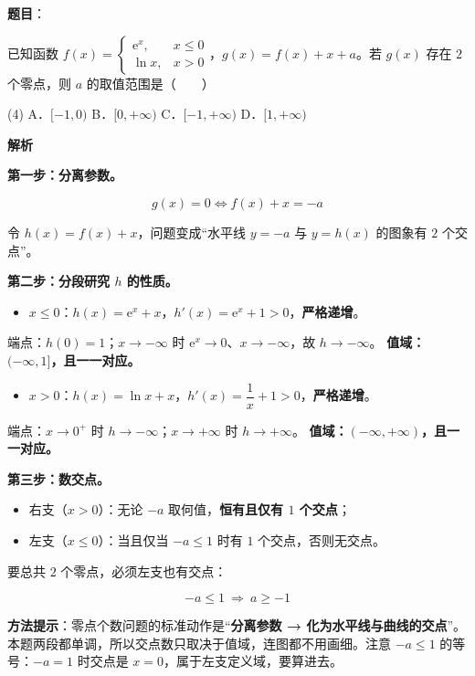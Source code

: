 \begin{answer}

\textbf{题目}：

已知函数 $f(x)=\begin{cases}\mathrm e^{x},&x\le0\\ \ln x,&x>0\end{cases}$，$g(x)=f(x)+x+a$。若 $g(x)$ 存在 $2$ 个零点，则 $a$ 的取值范围是\mbox{（　　）}

\begin{gkopts}(4)
\task A．$[-1,0)$
\task B．$[0,+\infty)$
\task C．$[-1,+\infty)$
\task D．$[1,+\infty)$
\end{gkopts}

\textbf{解析}

\textbf{第一步：分离参数。}

\nopagebreak[4]
\[g(x)=0\iff f(x)+x=-a\]

令 $h(x)=f(x)+x$，问题变成“水平线 $y=-a$ 与 $y=h(x)$ 的图象有 $2$ 个交点”。

\textbf{第二步：分段研究 $h$ 的性质。}

\begin{itemize}
\item $x\le0$：$h(x)=\mathrm e^{x}+x$，$h'(x)=\mathrm e^{x}+1>0$，\textbf{严格递增}。
\end{itemize}
  端点：$h(0)=1$；$x\to-\infty$ 时 $\mathrm e^{x}\to0$、$x\to-\infty$，故 $h\to-\infty$。
  \textbf{值域：$(-\infty,1]$，且一一对应。}

\begin{itemize}
\item $x>0$：$h(x)=\ln x+x$，$h'(x)=\dfrac1x+1>0$，\textbf{严格递增}。
\end{itemize}
  端点：$x\to0^{+}$ 时 $h\to-\infty$；$x\to+\infty$ 时 $h\to+\infty$。
  \textbf{值域：$(-\infty,+\infty)$，且一一对应。}

\textbf{第三步：数交点。}

\begin{itemize}
\item 右支（$x>0$）：无论 $-a$ 取何值，\textbf{恒有且仅有 $1$ 个交点}；
\item 左支（$x\le0$）：当且仅当 $-a\le1$ 时有 $1$ 个交点，否则无交点。
\end{itemize}

要总共 $2$ 个零点，必须左支也有交点：

\nopagebreak[4]
\[-a\le1\ \Longrightarrow\ a\ge-1\]

\begin{gktip}
\textbf{方法提示}：零点个数问题的标准动作是“\textbf{分离参数 → 化为水平线与曲线的交点}”。本题两段都单调，所以交点数只取决于值域，连图都不用画细。注意 $-a\le1$ 的等号：$-a=1$ 时交点是 $x=0$，属于左支定义域，要算进去。
\end{gktip}

\gkanswer{答案：C（$[-1,+\infty)$）}

\par\medskip

\end{answer}
